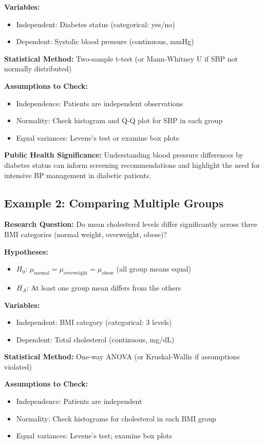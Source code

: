 \documentclass[11pt]{article}
\begin{document}
\textbf{Variables:}
\begin{itemize}
\item Independent: Diabetes status (categorical: yes/no)
\item Dependent: Systolic blood pressure (continuous, mmHg)
\end{itemize}

\textbf{Statistical Method:}
Two-sample t-test (or Mann-Whitney U if SBP not normally distributed)

\textbf{Assumptions to Check:}
\begin{itemize}
\item Independence: Patients are independent observations
\item Normality: Check histogram and Q-Q plot for SBP in each group
\item Equal variances: Levene's test or examine box plots
\end{itemize}

\textbf{Public Health Significance:}
Understanding blood pressure differences by diabetes status can inform screening recommendations and highlight the need for intensive BP management in diabetic patients.

\subsection*{Example 2: Comparing Multiple Groups}

\textbf{Research Question:}
Do mean cholesterol levels differ significantly across three BMI categories (normal weight, overweight, obese)?

\textbf{Hypotheses:}
\begin{itemize}
\item $H_0$: $\mu_{\text{normal}} = \mu_{\text{overweight}} = \mu_{\text{obese}}$ (all group means equal)
\item $H_A$: At least one group mean differs from the others
\end{itemize}

\textbf{Variables:}
\begin{itemize}
\item Independent: BMI category (categorical: 3 levels)
\item Dependent: Total cholesterol (continuous, mg/dL)
\end{itemize}

\textbf{Statistical Method:}
One-way ANOVA (or Kruskal-Wallis if assumptions violated)

\textbf{Assumptions to Check:}
\begin{itemize}
\item Independence: Patients are independent
\item Normality: Check histograms for cholesterol in each BMI group
\item Equal variances: Levene's test; examine box plots
\end{itemize}
\end{document}
